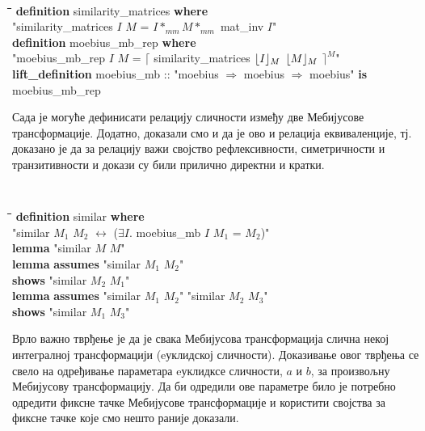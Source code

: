 {\tt 
  \begin{tabbing}
    \hspace{5mm}\=\hspace{5mm}\=\hspace{5mm}\=\hspace{5mm}\=\hspace{5mm}\=\kill
\textbf{definition} similarity\_matrices \textbf{where} \\
\> "similarity\_matrices $I$ $M$ = $I *_{mm} M  *_{mm}$ mat\_inv $I$" \\
\textbf{definition} moebius\_mb\_rep \textbf{where } \\
\> "moebius\_mb\_rep $I$ $M$ =  $\lceil$ similarity\_matrices $\lfloor I\rfloor_{M}$ $\lfloor M\rfloor_{M}$ $\rceil^{M}$" \\
\textbf{lift\_definition} moebius\_mb :: "moebius $\Rightarrow$ moebius $\Rightarrow$ moebius" \textbf{is}\\
\>  moebius\_mb\_rep
\end{tabbing}
}

Сада је могуће дефинисати релацију сличности између две Мебијусове
трансформације. Додатно, доказали смо и да је ово и релација
еквиваленције, тј. доказано је да за релацију важи својство
рефлексивности, симетричности и транзитивности и докази су били
прилично директни и кратки.

{\tt 
  \begin{tabbing}
    \hspace{5mm}\=\hspace{5mm}\=\hspace{5mm}\=\hspace{5mm}\=\hspace{5mm}\=\kill
\textbf{definition} similar \textbf{where} \\
\> "similar $M_1$ $M_2$ $\longleftrightarrow$ ($\exists I.$ moebius\_mb $I$ $M_1$ = $M_2$)"\\
\textbf{lemma} "similar $M$ $M$" \\
\textbf{lemma} \textbf{assumes} "similar $M_1$ $M_2$" \\
\>  \textbf{shows} "similar $M_2$ $M_1$" \\
\textbf{lemma} \textbf{assumes} "similar $M_1$ $M_2$" "similar $M_2$ $M_3$" \\
\>  \textbf{shows} "similar $M_1$ $M_3$"
\end{tabbing}
}

Врло важно тврђење је да је свака Мебијусова трансформација слична
некој интегралној трансформацији (eуклидској сличности). Доказивање
овог тврђења се свело на одређивање параметара eуклидксе сличности,
$a$ и $b$, за произвољну Мебијусову трансформацију. Да би одредили ове
параметре било је потребно одредити фиксне тачке Мебијусове
трансформације и користити својства за фиксне тачке које смо нешто
раније доказали.

